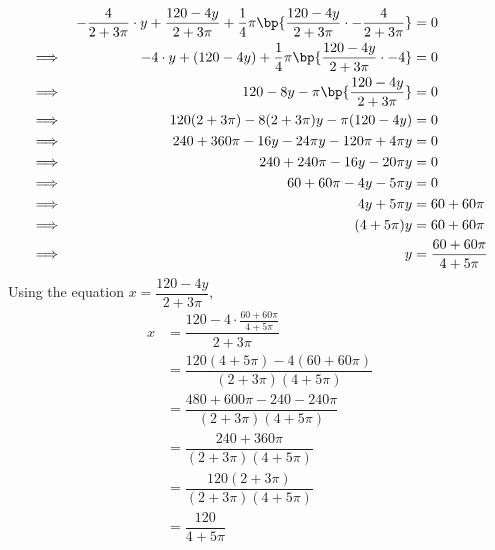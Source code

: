 \documentclass{echw}
\begin{document}
        \begin{alignat*}{2}
            &&-\dfrac4{2 + 3\pi} \cdot y + \dfrac{120-4y}{2+3\pi} + \dfrac14 \pi \bp{\dfrac{120-4y}{2+3\pi} \cdot -\dfrac4{2 + 3\pi}} &= 0\\
            \implies&&-4 \cdot y + (120-4y) + \dfrac14 \pi \bp{\dfrac{120-4y}{2+3\pi} \cdot -4} &= 0\\
            \implies&&120 - 8y - \pi \bp{\dfrac{120-4y}{2+3\pi}} &= 0\\
            \implies&&120(2+3\pi) - 8(2+3\pi)y - \pi(120-4y) &= 0\\
            \implies&&240 + 360\pi - 16y - 24\pi y - 120\pi + 4\pi y &= 0\\
            \implies&&240 + 240\pi - 16y - 20\pi y &= 0\\
            \implies&&60 + 60\pi - 4y - 5\pi y &= 0\\
            \implies&& 4y + 5\pi y &= 60 + 60\pi\\
            \implies&& (4 + 5\pi)y &= 60 + 60\pi\\
            \implies&& y &= \dfrac{60 + 60\pi}{4 + 5\pi}
        \end{alignat*}
        Using the equation $x = \dfrac{120-4y}{2 + 3\pi}$, 
        \begin{align*}
            x &= \dfrac{120-4\cdot\tfrac{60 + 60\pi}{4 + 5\pi}}{2 + 3\pi}\\
            &= \dfrac{120(4+5\pi) - 4(60 + 60\pi)}{(2+3\pi)(4+5\pi)}\\
            &= \dfrac{480 + 600\pi - 240 -240\pi}{(2+3\pi)(4+5\pi)}\\
            &= \dfrac{240 + 360\pi}{(2+3\pi)(4+5\pi)}\\
            &= \dfrac{120 (2 + 3\pi)}{(2+3\pi)(4+5\pi)}\\
            &= \dfrac{120}{4+5\pi}
        \end{align*}

\end{document}

